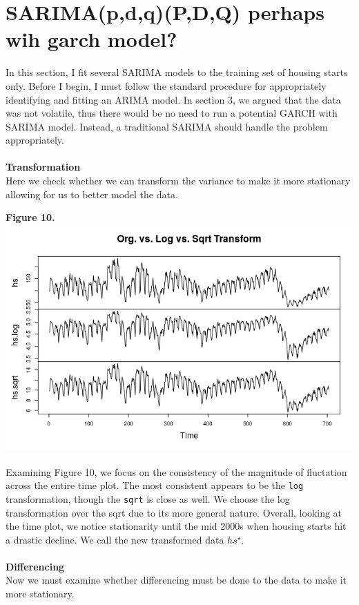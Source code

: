 \documentclass[11pt]{article}
\begin{document}
\section{SARIMA(p,d,q)(P,D,Q) perhaps wih garch model?}
In this section, I fit several SARIMA models to the training set of housing starts only. Before I begin, I must follow the standard procedure for appropriately identifying and fitting an ARIMA model. In section 3, we argued that the data was not volatile, thus there would be no need to run a potential GARCH with SARIMA model. Instead, a traditional SARIMA should handle the problem appropriately.
\\\\
\textbf{Transformation}
\\
Here we check whether we can transform the variance to make it more stationary allowing for us to better model the data.
\begin{center}
\textbf{Figure 10.}
\\
\includegraphics[scale=1]{trans}
\end{center}
Examining Figure 10, we focus on the consistency of the magnitude of fluctation across the entire time plot. The most consistent appears to be the {\tt log} transformation, though the {\tt sqrt} is close as well. We choose the log transformation over the sqrt due to its more general nature. Overall, looking at the time plot, we notice stationarity until the mid 2000s when housing starts hit a drastic decline. We call the new transformed data $hs^{\star}$. 
\\\\
\textbf{Differencing}
\\
Now we must examine whether differencing must be done to the data to make it more stationary.
\end{document}
